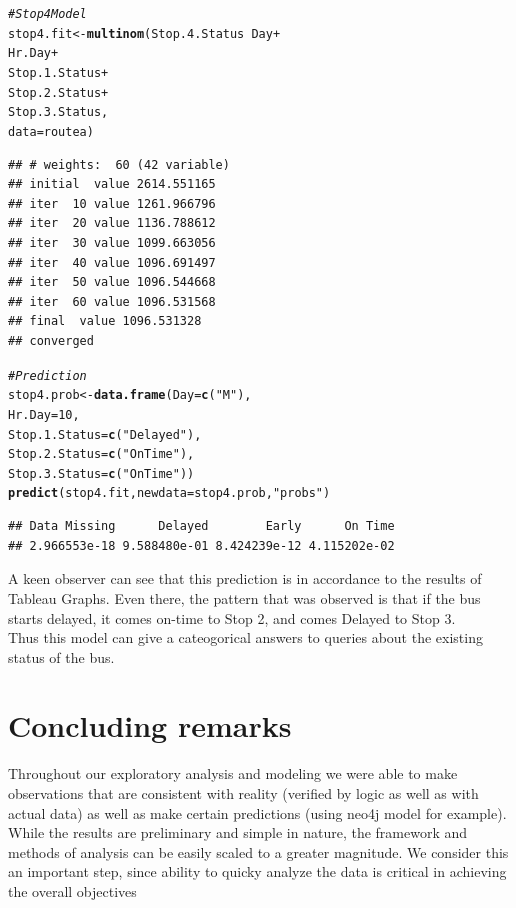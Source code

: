 \documentclass[12pt]{article}\usepackage[]{graphicx}\usepackage[]{color}
\makeatletter
\newcommand{\hlnum}[1]{\textcolor[rgb]{0.686,0.059,0.569}{#1}}%
\newcommand{\hlstr}[1]{\textcolor[rgb]{0.192,0.494,0.8}{#1}}%
\newcommand{\hlcom}[1]{\textcolor[rgb]{0.678,0.584,0.686}{\textit{#1}}}%
\newcommand{\hlopt}[1]{\textcolor[rgb]{0,0,0}{#1}}%
\newcommand{\hlstd}[1]{\textcolor[rgb]{0.345,0.345,0.345}{#1}}%
\newcommand{\hlkwb}[1]{\textcolor[rgb]{0.69,0.353,0.396}{#1}}%
\newcommand{\hlkwc}[1]{\textcolor[rgb]{0.333,0.667,0.333}{#1}}%
\newcommand{\hlkwd}[1]{\textcolor[rgb]{0.737,0.353,0.396}{\textbf{#1}}}%
\newenvironment{kframe}{%
 \def\at@end@of@kframe{}%
 \ifinner\ifhmode%
  \def\at@end@of@kframe{\end{minipage}}%
  \begin{minipage}{\columnwidth}%
 \fi\fi%
 \def\FrameCommand##1{\hskip\@totalleftmargin \hskip-\fboxsep
 \colorbox{shadecolor}{##1}\hskip-\fboxsep
     \hskip-\linewidth \hskip-\@totalleftmargin \hskip\columnwidth}%
 \MakeFramed {\advance\hsize-\width
   \@totalleftmargin\z@ \linewidth\hsize
   \@setminipage}}%
 {\par\unskip\endMakeFramed%
 \at@end@of@kframe}
\newenvironment{knitrout}{}{} %
\makeatother
\begin{document}
\begin{knitrout}
\begin{kframe}
\begin{alltt}
\hlcom{# Stop 4 Model}
\hlstd{stop4.fit}\hlkwb{<-}\hlkwd{multinom}\hlstd{(Stop.4.Status}\hlopt{~}\hlstd{Day}\hlopt{+}
                                                \hlstd{Hr.Day}\hlopt{+}
                                                \hlstd{Stop.1.Status}\hlopt{+}
                                                \hlstd{Stop.2.Status}\hlopt{+}
                                                \hlstd{Stop.3.Status,}
                                        \hlkwc{data}\hlstd{=routea)}
\end{alltt}
\begin{verbatim}
## # weights:  60 (42 variable)
## initial  value 2614.551165 
## iter  10 value 1261.966796
## iter  20 value 1136.788612
## iter  30 value 1099.663056
## iter  40 value 1096.691497
## iter  50 value 1096.544668
## iter  60 value 1096.531568
## final  value 1096.531328 
## converged
\end{verbatim}
\begin{alltt}
\hlcom{#Prediction}
\hlstd{stop4.prob}\hlkwb{<-}\hlkwd{data.frame}\hlstd{(}\hlkwc{Day}\hlstd{=}\hlkwd{c}\hlstd{(}\hlstr{"M"}\hlstd{),}
                                           \hlkwc{Hr.Day}\hlstd{=}\hlnum{10}\hlstd{,}
                                           \hlkwc{Stop.1.Status}\hlstd{=}\hlkwd{c}\hlstd{(}\hlstr{"Delayed"}\hlstd{),}
                                           \hlkwc{Stop.2.Status}\hlstd{=}\hlkwd{c}\hlstd{(}\hlstr{"On Time"}\hlstd{),}
                                           \hlkwc{Stop.3.Status}\hlstd{=}\hlkwd{c}\hlstd{(}\hlstr{"On Time"}\hlstd{))}
\hlkwd{predict}\hlstd{(stop4.fit,}\hlkwc{newdata} \hlstd{= stop4.prob,}\hlstr{"probs"}\hlstd{)}
\end{alltt}
\begin{verbatim}
## Data Missing      Delayed        Early      On Time 
## 2.966553e-18 9.588480e-01 8.424239e-12 4.115202e-02
\end{verbatim}
\end{kframe}
\end{knitrout}
A keen observer can see that this prediction is in accordance to the results of Tableau Graphs. Even there, the pattern that was observed is that if the bus starts delayed, it comes on-time to Stop 2, and comes Delayed to Stop 3.\\

Thus this model can give a cateogorical answers to queries about the existing status of the bus.\\

\section{Concluding remarks}
Throughout our exploratory analysis and modeling we were able to make observations that are consistent with reality (verified by logic as well as with actual data) as well as make certain predictions (using neo4j model for example). While the results are preliminary and simple in nature, the framework and methods of analysis can be easily scaled to a greater magnitude. We consider this an important step, since ability to quicky analyze the data is critical in achieving the overall objectives
\end{document}
